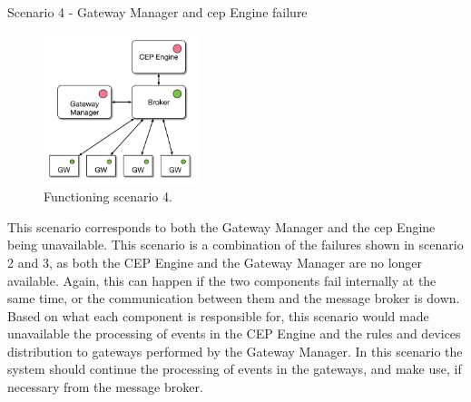 \begin{Paragraph}{Scenario 4 - Gateway Manager and \ac{cep} Engine failure}
	
	\begin{figure}[H]
		\centering
		\includegraphics[width=0.4\textwidth]{figures/fs4.png}
		\caption{Functioning scenario 4.}
		\label{fig:sc4}
	\end{figure}
	
	This scenario corresponds to both the Gateway Manager and the \ac{cep} Engine being unavailable. This scenario is a combination of the failures shown in scenario 2 and 3, as both the CEP Engine and the Gateway Manager are no longer available. Again, this can happen if the two components fail internally at the same time, or the communication between them and the message broker is down. Based on what each component is responsible for, this scenario would made unavailable the processing of events in the CEP Engine and the rules and devices distribution to gateways performed by the Gateway Manager. In this scenario the system should continue the processing of events in the gateways, and make use, if necessary from the message broker.
	
\end{Paragraph}


